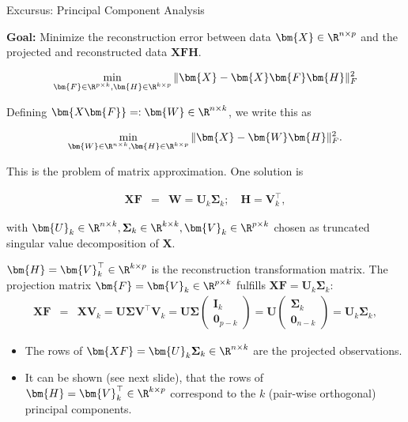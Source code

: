 \documentclass[11pt,compress,t,notes=noshow, xcolor=table]{beamer}
\begin{document}
\begin{vbframe}{Excursus: Principal Component Analysis}
\framebreak

\textbf{Goal:} Minimize the reconstruction error between data $\bm{X} \in \R^{n \times p}$ and the projected and reconstructed data $\bm{XFH}$.

$$
\min_{\bm{F} \in \R^{p \times k}, \bm{H} \in \R^{k \times p}} \|\bm{X} - \bm{X}\bm{F}\bm{H}\|^2_F
$$

Defining $\bm{X\bm{F}} =: \bm{W} \in \R^{n \times k}$, we write this as 

$$
\min_{\bm{W} \in \R^{n \times k}, \bm{H} \in \R^{k \times p}} \|\bm{X} - \bm{W}\bm{H}\|^2_F.
$$

This is the problem of matrix approximation. One solution is 

\begin{eqnarray*}
\bm{XF} &=&\bm{W} = \mathbf{U}_k \boldsymbol{\Sigma}_k; \quad \bm{H} =  \mathbf{V}_k^\top, 
\end{eqnarray*}

with $\bm{U}_k \in \R^{n \times k}, \boldsymbol{\Sigma}_k \in \R^{k \times k}, \bm{V}_k \in \R^{p \times k}$ chosen as truncated singular value decomposition of $\bm{X}$.

\lz 

$\bm{H} = \bm{V}_k^\top \in \R^{k \times p}$ is the reconstruction transformation matrix. The projection matrix $\bm{F} = \bm{V}_k \in \R^{p \times k}$ fulfills $\bm{XF} = \bm{U}_k \bm{\Sigma}_k$:
\begin{eqnarray*}
\bm{XF} &=& \bm{X}\bm{V}_k = \bm{U\Sigma V}^\top \bm{V}_k = \bm{U}\bm{\Sigma} \begin{pmatrix} \bm{I}_k \\ \bm{0}_{p - k}\end{pmatrix} = \bm{U} \begin{pmatrix} \bm{\Sigma}_k \\ \bm{0}_{n - k} \end{pmatrix} = \bm{U}_k \bm{\Sigma}_k,
\end{eqnarray*}

\begin{itemize}
	\item The rows of $\bm{XF} = \bm{U}_k \boldsymbol{\Sigma}_k \in \R^{n \times k}$ are the projected observations. 
	\item It can be shown (see next slide), that the rows of $\bm{H} = \bm{V}_k^\top \in \R^{k \times p}$ correspond to the $k$ (pair-wise orthogonal) principal components.
\end{itemize}

\framebreak


\end{vbframe}
\end{document}
